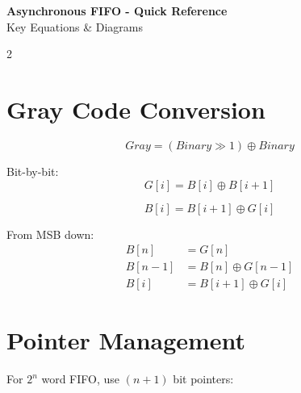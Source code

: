 \documentclass[10pt,landscape]{article}
\begin{document}
\begin{center}
\Huge\textbf{Asynchronous FIFO - Quick Reference}\\
\large Key Equations \& Diagrams
\end{center}

\begin{multicols}{2}

\section*{Gray Code Conversion}

\begin{tcolorbox}[colback=blue!5,colframe=blue!75!black,title=Binary to Gray]
\begin{equation*}
\boxed{Gray = (Binary \gg 1) \oplus Binary}
\end{equation*}

Bit-by-bit:
\begin{equation*}
G[i] = B[i] \oplus B[i+1]
\end{equation*}
\end{tcolorbox}

\begin{tcolorbox}[colback=blue!5,colframe=blue!75!black,title=Gray to Binary]
\begin{equation*}
\boxed{B[i] = B[i+1] \oplus G[i]}
\end{equation*}

From MSB down:
\begin{align*}
B[n] &= G[n] \\
B[n-1] &= B[n] \oplus G[n-1] \\
B[i] &= B[i+1] \oplus G[i]
\end{align*}
\end{tcolorbox}

\section*{Pointer Management}

\begin{tcolorbox}[colback=green!5,colframe=green!75!black,title=Pointer Structure]
For $2^n$ word FIFO, use $(n+1)$ bit pointers:


\end{tcolorbox}
\end{multicols}
\end{document}
